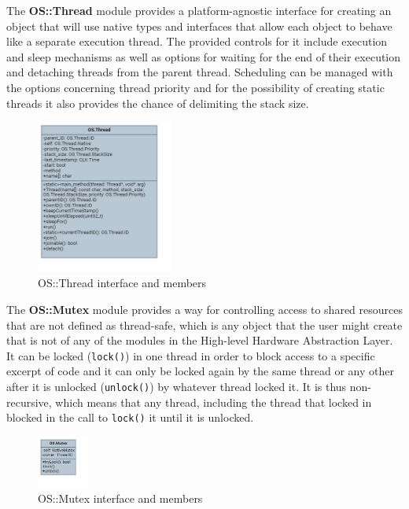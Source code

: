 The \textbf{OS::Thread} module provides a platform-agnostic interface for creating an object that will use native types and interfaces that allow each object to behave like a separate execution thread. The provided controls for it include execution and sleep mechanisms as well as options for waiting for the end of their execution and detaching threads from the parent thread. Scheduling can be managed with the options concerning thread priority and for the possibility of creating static threads it also provides the chance of delimiting the stack size. 

\begin{figure}[H]
	\centering
	\includegraphics[width=0.4\textwidth]{./img/navig-class-thread.png}
	\caption {OS::Thread interface and members}
	\label{fig:navig-class-thread}
	\end{figure}


The \textbf{OS::Mutex} module provides a way for controlling access to shared resources that are not defined as thread-safe, which is any object that the user might create that is not of any of the modules in the High-level Hardware Abstraction Layer. It can be locked (\texttt{lock()}) in one thread in order to block access to a specific excerpt of code and it can only be locked again by the same thread or any other after it is unlocked (\texttt{unlock()}) by whatever thread locked it. It is thus non-recursive, which means that any thread, including the thread that locked in blocked in the call to \texttt{lock()} it until it is unlocked.

\begin{figure}[H]
	\centering
	\includegraphics[width=0.15\textwidth]{./img/navig-class-mutex.png}
	\caption {OS::Mutex interface and members}
	\label{fig:navig-class-mutex}
	\end{figure}


